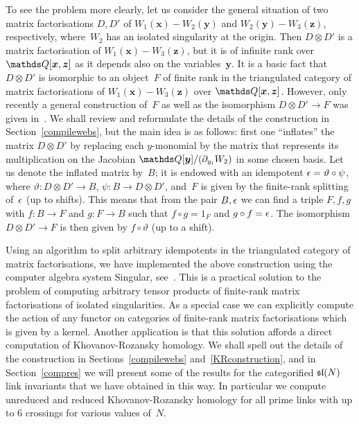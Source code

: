 \documentclass{compositio}
\theoremstyle{definition}
\numberwithin{equation}{section}
\begin{document}
To see the problem more clearly, let us consider the general situation of two matrix factorisations $D,D'$ of $W_{1}(\boldsymbol{x})-W_{2}(\boldsymbol{y})$ and $W_{2}(\boldsymbol{y})-W_{3}(\boldsymbol{z})$, respectively, where~$W_{2}$ has an isolated singularity at the origin. Then $D\otimes D'$ is a matrix factorisation of $W_{1}(\boldsymbol{x})-W_{3}(\boldsymbol{z})$, but it is of infinite rank over $\nQ[\boldsymbol{x},\boldsymbol{z}]$ as it depends also on the variables~$\boldsymbol{y}$. It is a basic fact that $D\otimes D'$ is isomorphic to an object~$F$ of finite rank in the triangulated category of matrix factorisations of $W_{1}(\boldsymbol{x})-W_{3}(\boldsymbol{z})$ over $\nQ[\boldsymbol{x},\boldsymbol{z}]$. However, only recently a general construction of~$F$ as well as the isomorphism $D\otimes D'\longrightarrow F$ was given in~\cite{dm1102.2957}. We shall review and reformulate the details of the construction in Section~\ref{compilewebs}, but the main idea is as follows:  first one ``inflates'' the matrix $D\otimes D'$ by replacing each $y$-monomial by the matrix that represents its multiplication on the Jacobian $\nQ[\boldsymbol{y}]/(\partial_{y_{i}} W_{2})$ in some chosen basis. Let us denote the inflated matrix by~$B$; it is endowed with an idempotent $\epsilon=\vartheta\circ\psi$, where $\vartheta: D\otimes D'\longrightarrow B$, $\psi: B\longrightarrow D\otimes D'$, and~$F$ is given by the finite-rank splitting of~$\epsilon$ (up to shifts). This means that from the pair $B,\epsilon$ we can find a triple $F,f,g$ with $f:B\longrightarrow F$ and $g:F\longrightarrow B$ such that $f\circ g=1_{F}$ and $g\circ f=\epsilon$. The isomorphism $D\otimes D'\longrightarrow F$ is then given by $f\circ\vartheta$ (up to a shift). 

Using an algorithm to split arbitrary idempotents in the triangulated category of matrix factorisations, we have implemented the above construction using the computer algebra system Singular, see~\cite{cmWebCompileCode}. This is a practical solution to the problem of computing arbitrary tensor products of finite-rank matrix factorisations of isolated singularities. As a special case we can explicitly compute the action of any functor on categories of finite-rank matrix factorisations which is given by a kernel. Another application is that this solution affords a direct computation of Khovanov-Rozansky homology. We shall spell out the details of the construction in Sections~\ref{compilewebs} and~\ref{KRconstruction}, and in Section~\ref{compres} we will present some of the results for the categorified $\mathfrak{sl}(N)$ link invariants that we have obtained in this way. In particular we compute unreduced and reduced Khovanov-Rozansky homology for all prime links with up to 6 crossings for various values of~$N$. 
\end{document}

